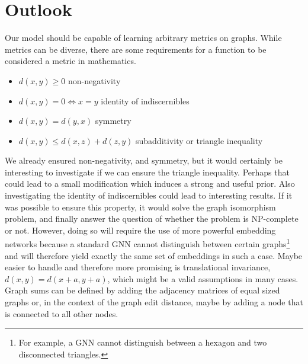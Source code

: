 \section{Outlook}

Our model should be capable of learning arbitrary metrics on graphs. While metrics can be diverse, there are some requirements for a function to be considered a metric in mathematics.
\begin{itemize}
    \itemsep0em
    \item $d(x,y) \ge 0$ non-negativity
    \item $d(x,y) = 0 \Leftrightarrow x = y$ identity of indiscernibles
    \item $d(x,y)  = d(y,x)$ symmetry
    \item $d(x,y) \le d(x,z) + d(z, y)$ subadditivity or triangle inequality
\end{itemize}
We already ensured non-negativity, and symmetry, but it would certainly be interesting to investigate if we can ensure the triangle inequality. Perhaps that could lead to a small modification which induces a strong and useful prior. Also investigating the identity of indiscernibles could lead to interesting results. If it was possible to ensure this property, it would solve the graph isomorphism problem, and finally answer the question of whether the problem is NP-complete or not. However, doing so will require the use of more powerful embedding networks because a standard GNN cannot distinguish between certain graphs\footnote{For example, a GNN cannot distinguish between a hexagon and two disconnected triangles.} and will therefore yield exactly the same set of embeddings in such a case. Maybe easier to handle and therefore more promising is translational invariance, $d(x,y) = d(x+a,y+a)$, which might be a valid assumptions in many cases. Graph sums can be defined by adding the adjacency matrices of equal sized graphs \cite{graph_sum2004} or, in the context of the graph edit distance, maybe by adding a node that is connected to all other nodes.

